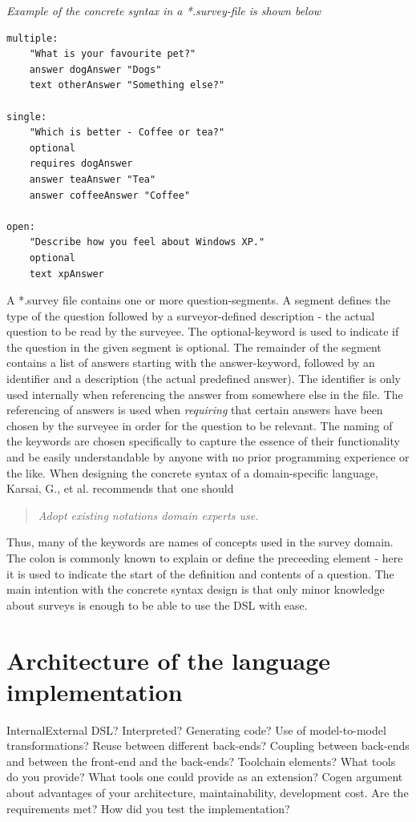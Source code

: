 \documentclass[runningheads]{llncs}
\begin{document}
\noindent
{\it Example of the concrete syntax in a *.survey-file is shown below}
\begin{verbatim}
multiple:
	"What is your favourite pet?"
	answer dogAnswer "Dogs"
	text otherAnswer "Something else?"

single:
	"Which is better - Coffee or tea?"
	optional
	requires dogAnswer
	answer teaAnswer "Tea"
	answer coffeeAnswer "Coffee" 

open:
	"Describe how you feel about Windows XP."
	optional
	text xpAnswer
\end{verbatim}
%
\noindent
A *.survey file contains one or more question-segments. A segment defines the type of the question followed by a surveyor-defined description - the actual question to be read by the surveyee. The optional-keyword is used to indicate if the question in the given segment is optional. The remainder of the segment contains a list of answers starting with the answer-keyword, followed by an identifier and a description (the actual predefined answer). The identifier is only used internally when referencing the answer from somewhere else in the file. The referencing of answers is used when \emph{requiring} that certain answers have been chosen by the surveyee in order for the question to be relevant. The naming of the keywords are chosen specifically to capture the essence of their functionality and be easily understandable by anyone with no prior programming experience or the like. When designing the concrete syntax of a domain-specific language, Karsai, G., et al.\cite{karsai} recommends that one should
\begin{quotation}
 \emph{Adopt existing notations domain experts use.}
\end{quotation}
Thus, many of the keywords are names of concepts used in the survey domain. The colon is commonly known to explain or define the preceeding element - here it is used to indicate the start of the definition and contents of a question. The main intention with the concrete syntax design is that only minor knowledge about surveys is enough to be able to use the DSL with ease. 

\section{Architecture of the language implementation}
Internal\/External DSL? Interpreted? Generating code? Use of
model-to-model transformations?
Reuse between different back-ends? Coupling between back-ends and
between the front-end and the back-ends?
Toolchain elements? What tools do you provide? What tools one could
provide as an extension?
Cogen argument about advantages of your architecture, maintainability,
development cost.
Are the requirements met?
How did you test the implementation?
\end{document}
